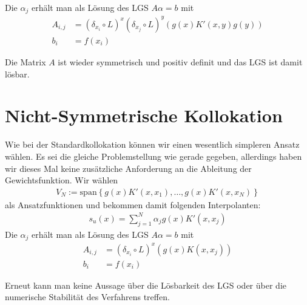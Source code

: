 Die $\alpha_j$ erhält man als Lösung des \ac{LGS} $A\alpha = b$ mit 
\begin{align*}
A_{i,j} &= (\delta_{x_i} \circ L)^x (\delta_{x_j} \circ L)^y (g(x)K'(x,y)g(y))\\
b_i &= f(x_i)
\end{align*}

Die Matrix $A$ ist wieder symmetrisch und positiv definit und das \ac{LGS} ist damit lösbar.
\section{Nicht-Symmetrische Kollokation}
Wie bei der Standardkollokation können wir einen wesentlich simpleren Ansatz wählen. Es sei die gleiche Problemstellung wie gerade gegeben, allerdings haben wir dieses Mal keine zusätzliche Anforderung an die Ableitung der Gewichtsfunktion. Wir wählen 
\begin{align*}
V_N:= \text{span} \left\{g(x)K'(x,x_1), \dots, g(x)K'(x,x_N)\right\}
\end{align*}
als Ansatzfunktionen und bekommen damit folgenden Interpolanten:
\begin{align*}
s_u (x) = \sum_{j=1}^N \alpha_j g(x)K'(x,x_j)
\end{align*}
Die $\alpha_j$ erhält man als Lösung des \ac{LGS} $A\alpha = b$ mit 
\begin{align*}
A_{i,j} &= (\delta_{x_i} \circ L)^x (g(x) K(x,x_j))\\
b_i &= f(x_i)
\end{align*}

Erneut kann man keine Aussage über die Lösbarkeit des \ac{LGS} oder über die numerische Stabilität des Verfahrens treffen.